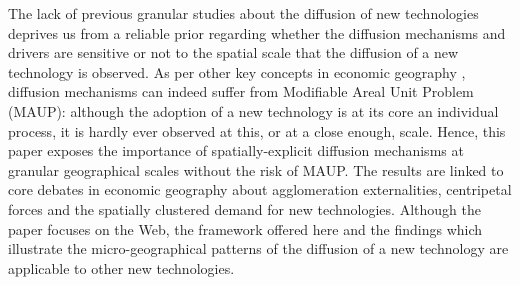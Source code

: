 \documentclass[
  authoryear,
  preprint,
  3p]{elsarticle}
\begin{document}
The lack of previous granular studies about the diffusion of new
technologies deprives us from a reliable prior regarding whether the
diffusion mechanisms and drivers are sensitive or not to the spatial
scale that the diffusion of a new technology is observed. As per other
key concepts in economic geography
\citep{briant2010dots, meliciani2015determinants, andini2019social},
diffusion mechanisms can indeed suffer from Modifiable Areal Unit
Problem (MAUP): although the adoption of a new technology is at its core
an individual process, it is hardly ever observed at this, or at a close
enough, scale. Hence, this paper exposes the importance of
spatially-explicit diffusion mechanisms at granular geographical scales
without the risk of MAUP. The results are linked to core debates in
economic geography about agglomeration externalities, centripetal forces
and the spatially clustered demand for new technologies. Although the
paper focuses on the Web, the framework offered here and the findings
which illustrate the micro-geographical patterns of the diffusion of a
new technology are applicable to other new technologies.
\end{document}

